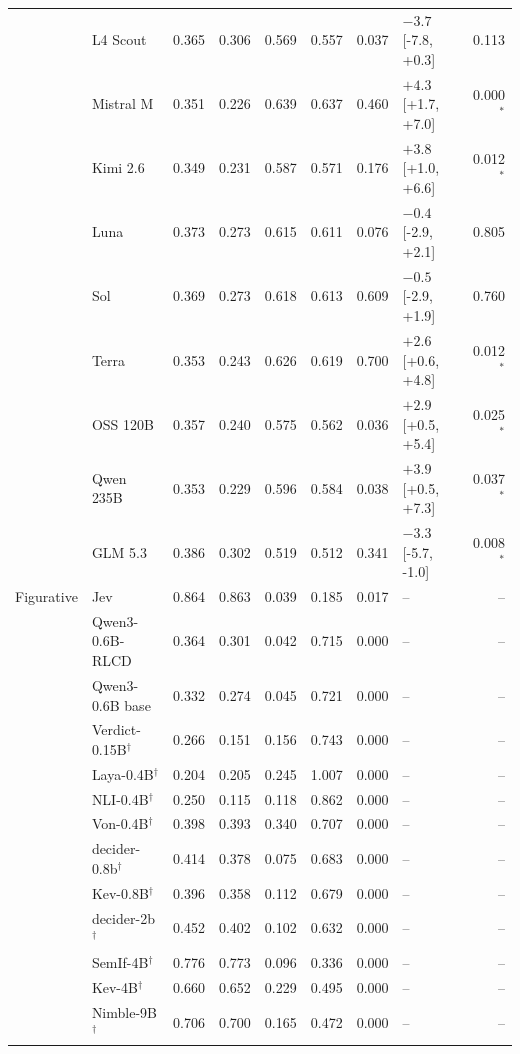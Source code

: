 \begin{longtable}{llrrrrrlr}
 & L4 Scout & 0.365 & 0.306 & 0.569 & 0.557 & 0.037 & $-3.7$ [-7.8, +0.3] & 0.113 \\
 & Mistral M & 0.351 & 0.226 & 0.639 & 0.637 & 0.460 & $+4.3$ [+1.7, +7.0] & 0.000$^{*}$ \\
 & Kimi 2.6 & 0.349 & 0.231 & 0.587 & 0.571 & 0.176 & $+3.8$ [+1.0, +6.6] & 0.012$^{*}$ \\
 & Luna & 0.373 & 0.273 & 0.615 & 0.611 & 0.076 & $-0.4$ [-2.9, +2.1] & 0.805 \\
 & Sol & 0.369 & 0.273 & 0.618 & 0.613 & 0.609 & $-0.5$ [-2.9, +1.9] & 0.760 \\
 & Terra & 0.353 & 0.243 & 0.626 & 0.619 & 0.700 & $+2.6$ [+0.6, +4.8] & 0.012$^{*}$ \\
 & OSS 120B & 0.357 & 0.240 & 0.575 & 0.562 & 0.036 & $+2.9$ [+0.5, +5.4] & 0.025$^{*}$ \\
 & Qwen 235B & 0.353 & 0.229 & 0.596 & 0.584 & 0.038 & $+3.9$ [+0.5, +7.3] & 0.037$^{*}$ \\
 & GLM 5.3 & 0.386 & 0.302 & 0.519 & 0.512 & 0.341 & $-3.3$ [-5.7, -1.0] & 0.008$^{*}$ \\
\midrule
Figurative & Jev & 0.864 & 0.863 & 0.039 & 0.185 & 0.017 & -- & -- \\
 & Qwen3-0.6B-RLCD & 0.364 & 0.301 & 0.042 & 0.715 & 0.000 & -- & -- \\
 & Qwen3-0.6B base & 0.332 & 0.274 & 0.045 & 0.721 & 0.000 & -- & -- \\
 & Verdict-0.15B$^{\dagger}$ & 0.266 & 0.151 & 0.156 & 0.743 & 0.000 & -- & -- \\
 & Laya-0.4B$^{\dagger}$ & 0.204 & 0.205 & 0.245 & 1.007 & 0.000 & -- & -- \\
 & NLI-0.4B$^{\dagger}$ & 0.250 & 0.115 & 0.118 & 0.862 & 0.000 & -- & -- \\
 & Von-0.4B$^{\dagger}$ & 0.398 & 0.393 & 0.340 & 0.707 & 0.000 & -- & -- \\
 & decider-0.8b$^{\dagger}$ & 0.414 & 0.378 & 0.075 & 0.683 & 0.000 & -- & -- \\
 & Kev-0.8B$^{\dagger}$ & 0.396 & 0.358 & 0.112 & 0.679 & 0.000 & -- & -- \\
 & decider-2b$^{\dagger}$ & 0.452 & 0.402 & 0.102 & 0.632 & 0.000 & -- & -- \\
 & SemIf-4B$^{\dagger}$ & 0.776 & 0.773 & 0.096 & 0.336 & 0.000 & -- & -- \\
 & Kev-4B$^{\dagger}$ & 0.660 & 0.652 & 0.229 & 0.495 & 0.000 & -- & -- \\
 & Nimble-9B$^{\dagger}$ & 0.706 & 0.700 & 0.165 & 0.472 & 0.000 & -- & -- \\

\end{longtable}
